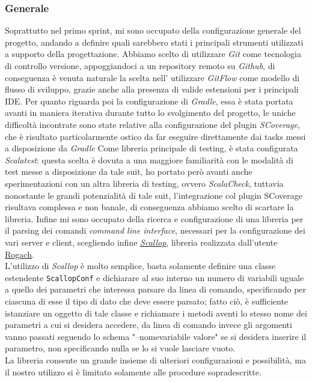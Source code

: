\subsubsection{\textbf{Generale}}
Soprattutto nel primo sprint, mi sono occupato della configurazione generale del progetto, andando a definire quali sarebbero stati i principali strumenti utilizzati a supporto della progettazione.
Abbiamo scelto di utilizzare \textit{Git} come tecnologia di controllo versione, appoggiandoci a un repository remoto su \textit{Github}, di conseguenza è venuta naturale la scelta nell' utilizzare \textit{GitFlow} come modello di flusso di sviluppo, grazie anche alla presenza di valide estensioni per i principali IDE.
Per quanto riguarda poi la configurazione di \textit{Gradle}, essa è stata portata avanti in maniera iterativa durante tutto lo svolgimento del progetto, le uniche difficoltà incontrate sono state relative alla configurazione del plugin \textit{SCoverage}, che è risultato particolarmente ostico da far eseguire direttamente dai tasks messi a disposizione da \textit{Gradle}
Come libreria principale di testing, è stata configurata \textit{Scalatest}: questa scelta è dovuta a una maggiore familiarità con le modalità di test messe a disposizione da tale suit, ho portato però avanti anche sperimentazioni con un altra libreria di testing, ovvero \textit{ScalaCheck}, tuttavia nonostante le grandi potenzialità di tale suit, l'integrazione col plugin SCoverage risultava complessa e non banale, di conseguenza abbiamo scelto di scartare la libreria.
Infine mi sono occupato della ricerca e configurazione di una libreria per il parsing dei comandi \textit{command line interface}, necessari per la configurazione dei vari server e client, scegliendo infine \href{https://github.com/scallop/scallop}{\textit{Scallop}}, libreria realizzata dall'utente \href{https://github.com/Rogach}{Rogach}.\\
L'utilizzo di \textit{Scallop} è molto semplice, basta solamente definire una classe estendente \texttt{ScallopConf} e dichiarare al suo interno un numero di variabili uguale a quello dei parametri che interessa parsare da linea di comando, specificando per ciascuna di esse il tipo di dato che deve essere parsato; fatto ciò, è sufficiente istanziare un oggetto di tale classe e richiamare i metodi aventi lo stesso nome dei parametri a cui si desidera accedere, da linea di comando invece gli argomenti vanno passati seguendo lo schema "--nomevariabile valore" se si desidera inserire il parametro, non specificando nulla se lo si vuole lasciare vuoto.\\
La libreria consente un grande insieme di ulteriori configurazioni e possibilità, ma il nostro utilizzo si è limitato solamente alle procedure sopradescritte.

